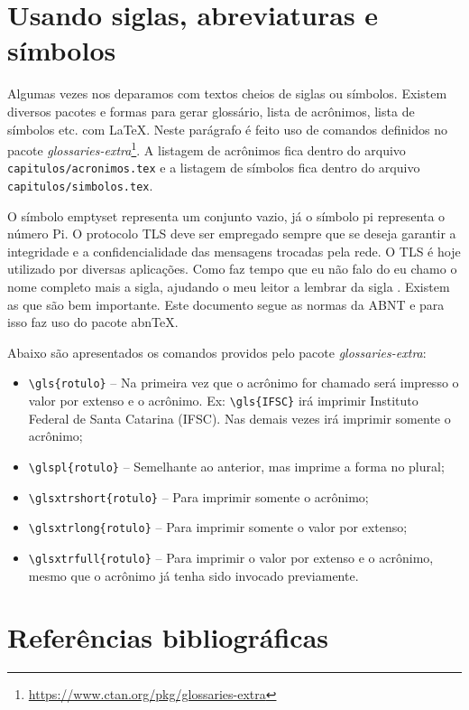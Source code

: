 \section{Usando siglas, abreviaturas e símbolos}

Algumas vezes nos deparamos com textos cheios de siglas ou símbolos. Existem diversos pacotes e formas para gerar glossário, lista de acrônimos, lista de símbolos etc. com \LaTeX. Neste parágrafo é feito uso de comandos definidos no pacote \textit{glossaries-extra}\footnote{\url{https://www.ctan.org/pkg/glossaries-extra}}. A listagem de acrônimos fica dentro do arquivo \texttt{capitulos/acronimos.tex} e a listagem de símbolos fica dentro do arquivo \texttt{capitulos/simbolos.tex}.

O símbolo \gls{emptyset} representa um conjunto vazio, já o símbolo \gls{pi} representa o número Pi. O protocolo \gls{TLS} deve ser empregado sempre que se deseja garantir a integridade e a confidencialidade das mensagens trocadas pela rede. O \gls{TLS} é hoje utilizado por diversas aplicações. Como faz tempo que eu não falo do  eu chamo o nome completo mais a sigla, ajudando o meu leitor a lembrar da sigla . Existem as  que são bem importante. Este documento segue as normas da \gls{ABNT} e para isso faz uso do pacote \gls{abnTeX}.

Abaixo são apresentados os comandos providos pelo pacote \textit{glossaries-extra}:

\begin{itemize}
    \item \verb+\gls{rotulo}+ -- Na primeira vez que o acrônimo for chamado será impresso o valor por extenso e o acrônimo. Ex: \verb+\gls{IFSC}+ irá imprimir Instituto Federal de Santa Catarina (IFSC). Nas demais vezes irá imprimir somente o acrônimo;
    \item \verb+\glspl{rotulo}+ -- Semelhante ao anterior, mas imprime a forma no plural;
    \item \verb+\glsxtrshort{rotulo}+ -- Para imprimir somente o acrônimo;
    \item \verb+\glsxtrlong{rotulo}+ -- Para imprimir somente o valor por extenso;
    \item \verb+\glsxtrfull{rotulo}+ -- Para imprimir o valor por extenso e o acrônimo, mesmo que o acrônimo já tenha sido invocado previamente.
\end{itemize}



\section{Referências bibliográficas}\label{sec:referencias}

